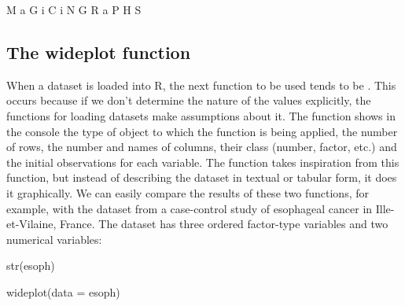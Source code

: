\begin{Schunk}
	\begin{Soutput}
  M a G i C i N G R a P H S
	\end{Soutput}
\end{Schunk}

\hypertarget{the-wideplot-function}{%
	\subsection{The wideplot function}\label{the-wideplot-function}}

When a dataset is loaded into R, the next function to be used
tends to be . This occurs because if we don't determine the
nature of the values explicitly, the functions for loading datasets make
assumptions about it. The function  shows in the console the
type of object to which the function is being applied, the number of
rows, the number and names of columns, their class (number, factor,
etc.) and the initial observations for each variable. The
 function takes inspiration from this function, but
instead of describing the dataset in textual or tabular form, it does it
graphically. We can easily compare the results of these two functions,
for example, with the dataset  from a case-control study of
esophageal cancer in Ille-et-Vilaine, France. The dataset has three
ordered factor-type variables and two numerical variables:

\small

\begin{example}
  str(esoph)
\end{example}
\begin{Schunk}
\end{Schunk}

\normalsize

\begin{example}
  wideplot(data = esoph)
\end{example}


\vspace{-5pt}

